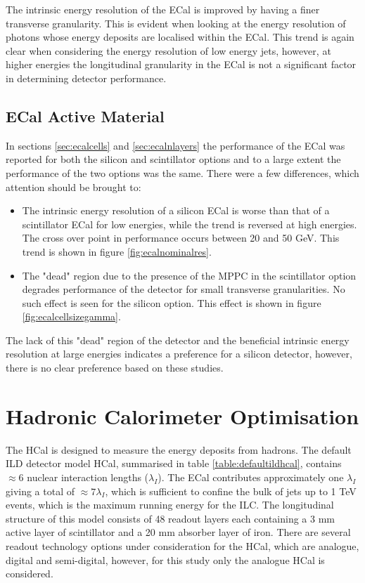 The intrinsic energy resolution of the ECal is improved by having a finer transverse granularity.  This is evident when looking at the energy resolution of photons whose energy deposits are localised within the ECal.  This trend is again clear when considering the energy resolution of low energy jets, however, at higher energies the longitudinal granularity in the ECal is not a significant factor in determining detector performance.

\subsection{ECal Active Material}
In sections \ref{sec:ecalcells} and \ref{sec:ecalnlayers} the performance of the ECal was reported for both the silicon and scintillator options and to a large extent the performance of the two options was the same.  There were a few differences, which attention should be brought to:

\begin{itemize}
\item The intrinsic energy resolution of a silicon ECal is worse than that of a scintillator ECal for low energies, while the trend is reversed at high energies.  The cross over point in performance occurs between 20 and 50 GeV.  This trend is shown in figure \ref{fig:ecalnominalres}.    
\item The "dead" region due to the presence of the MPPC in the scintillator option degrades performance of the detector for small transverse granularities.  No such effect is seen for the silicon option.  This effect is shown in figure \ref{fig:ecalcellsizegamma}.
\end{itemize}

The lack of this "dead" region of the detector and the beneficial intrinsic energy resolution at large energies indicates a preference for a silicon detector, however, there is no clear preference based on these studies.  


\section{Hadronic Calorimeter Optimisation}
The HCal is designed to measure the energy deposits from hadrons.  The default ILD detector model HCal, summarised in table \ref{table:defaultildhcal}, contains $\approx 6$ nuclear interaction lengths ($\lambda_{I}$).  The ECal contributes approximately one $\lambda_{I}$ giving a total of $\approx 7 \lambda_{I}$, which is sufficient to confine the bulk of jets up to 1 TeV events, which is the maximum running energy for the ILC.  The longitudinal structure of this model consists of 48 readout layers each containing a 3 mm active layer of scintillator and a 20 mm absorber layer of iron.  There are several readout technology options under consideration for the HCal, which are analogue, digital and semi-digital, however, for this study only the analogue HCal is considered.  

